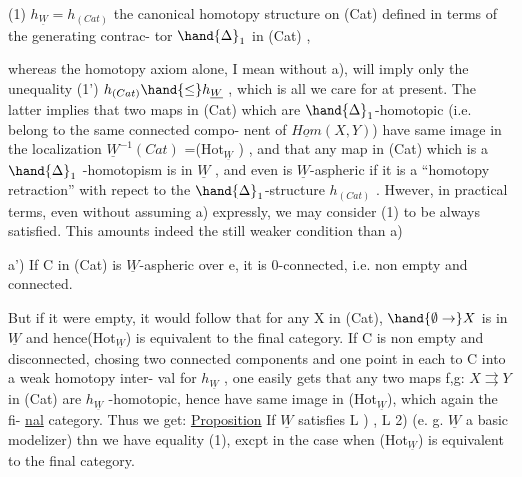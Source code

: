 
(1) \qquad $h_{\underline{W}} = h_{(Cat)}$ \quad the canonical homotopy structure on (Cat)
defined in terms of the generating contrac-%
tor $\hand{\Delta}_1$ in (Cat)\hand{,} \hfill ,

whereas the homotopy axiom  alone, I mean without a), will imply
only the unequality
(1') \qquad $h_{(Cat)} \hand{\leq} h_{\underline{W}}$ ,
which is all we care for at present. The latter implies that two maps in
(Cat) which are $\hand{\Delta}_1$-homotopic (i.e. belong to the same connected compo-%
nent of $\underline{Hom}(X,Y)$) have same image in the localization $\underline{W}^{-1}(Cat)$ =(Hot$_{\underline{W}}$ ) ,
and that any map in (Cat) which is a $\hand{\Delta}_1$ -homotopism is in $\underline{W}$ , and even
is $\underline{W}$-aspheric if it is a ``homotopy retraction'' with repect to the
$\hand{\Delta}_1$-structure $h_{(Cat)}$ . Hwever,  in practical terms, even without
assuming a) expressly, we may consider (1) to be always satisfied. This
amounts indeed  the still weaker condition than a)

 a') If C in (Cat) is $\underline{W}$-aspheric over e, it is 0-connected, i.e.
non empty and connected.

But if it were empty, it would follow that for any X in (Cat),
$\hand{\emptyset \to} X$ is in $\underline{W}$ and hence(Hot$_{\underline{W}}$) is equivalent to the final category. If
C  is non empty and disconnected, chosing  two connected
components and one point in each to  C into a weak homotopy inter-%
val for $h_{\underline{W}}$ , one easily gets that any two maps f,g: $X \rightrightarrows Y$ in (Cat) are
$h_{\underline{W}}$ -homotopic, hence have same image in (Hot$_{\underline{W}}$), which again   the fi-%
\uline{nal} category. Thus we get:
\uline{Proposition} If $\underline{W}$ satisfies L  ) , L 2) (e. g. $\underline{W}$ a basic modelizer)
thn we have equality (1), excpt in the case when (Hot$_{\underline{W}}$) is equivalent
to the final category.

